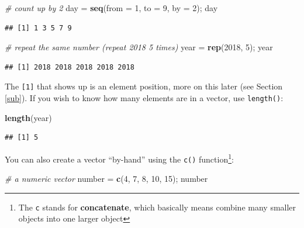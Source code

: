 \documentclass[]{book}
\newenvironment{Shaded}{\begin{snugshade}}{\end{snugshade}}
\newcommand{\KeywordTok}[1]{\textcolor[rgb]{0.13,0.29,0.53}{\textbf{#1}}}
\newcommand{\DataTypeTok}[1]{\textcolor[rgb]{0.13,0.29,0.53}{#1}}
\newcommand{\DecValTok}[1]{\textcolor[rgb]{0.00,0.00,0.81}{#1}}
\newcommand{\StringTok}[1]{\textcolor[rgb]{0.31,0.60,0.02}{#1}}
\newcommand{\CommentTok}[1]{\textcolor[rgb]{0.56,0.35,0.01}{\textit{#1}}}
\newcommand{\NormalTok}[1]{#1}
\let\rmarkdownfootnote\footnote%
\def\footnote{\protect\rmarkdownfootnote}
\theoremstyle{definition}
\theoremstyle{definition}
\theoremstyle{definition}
\theoremstyle{remark}
\begin{document}
\begin{Shaded}
\begin{Highlighting}[]
\CommentTok{# count up by 2}
\NormalTok{day =}\StringTok{ }\KeywordTok{seq}\NormalTok{(}\DataTypeTok{from =} \DecValTok{1}\NormalTok{, }\DataTypeTok{to =} \DecValTok{9}\NormalTok{, }\DataTypeTok{by =} \DecValTok{2}\NormalTok{); day}
\end{Highlighting}
\end{Shaded}

\begin{verbatim}
## [1] 1 3 5 7 9
\end{verbatim}

\begin{Shaded}
\begin{Highlighting}[]
\CommentTok{# repeat the same number (repeat 2018 5 times)}
\NormalTok{year =}\StringTok{ }\KeywordTok{rep}\NormalTok{(}\DecValTok{2018}\NormalTok{, }\DecValTok{5}\NormalTok{); year}
\end{Highlighting}
\end{Shaded}

\begin{verbatim}
## [1] 2018 2018 2018 2018 2018
\end{verbatim}

The \texttt{{[}1{]}} that shows up is an element position, more on this
later (see Section \ref{sub}). If you wish to know how many elements are
in a vector, use \texttt{length()}:

\begin{Shaded}
\begin{Highlighting}[]
\KeywordTok{length}\NormalTok{(year)}
\end{Highlighting}
\end{Shaded}

\begin{verbatim}
## [1] 5
\end{verbatim}

You can also create a vector ``by-hand'' using the \texttt{c()}
function\footnote{The \texttt{c} stands for \textbf{concatenate}, which
  basically means combine many smaller objects into one larger object}:

\begin{Shaded}
\begin{Highlighting}[]
\CommentTok{# a numeric vector}
\NormalTok{number =}\StringTok{ }\KeywordTok{c}\NormalTok{(}\DecValTok{4}\NormalTok{, }\DecValTok{7}\NormalTok{, }\DecValTok{8}\NormalTok{, }\DecValTok{10}\NormalTok{, }\DecValTok{15}\NormalTok{); number}
\end{Highlighting}
\end{Shaded}
\end{document}

